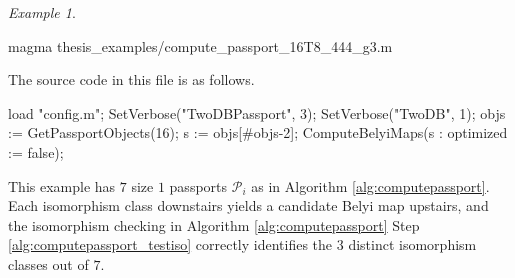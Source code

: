 \documentclass{dcthesis}
\newcommand{\mm}[1]{{\color{blue} \sf MM: [#1]}}
\numberwithin{equation}{section}
\theoremstyle{definition}
\theoremstyle{remark}
\newtheorem{example}[equation]{Example}
\begin{document}
{{{\begin{example}
\begin{code}
magma thesis_examples/compute_passport_16T8_444_g3.m
      \end{code}
      The source code in this file is
      as follows.
      \begin{magma}
load "config.m";
SetVerbose("TwoDBPassport", 3);
SetVerbose("TwoDB", 1);
objs := GetPassportObjects(16);
s := objs[#objs-2];
ComputeBelyiMaps(s : optimized := false);
      \end{magma}
      This example has $7$ size $1$ passports
      $\mathcal{P}_i$ as in
      Algorithm \ref{alg:computepassport}.
      Each isomorphism class downstairs
      yields a candidate Belyi map upstairs,
      and the isomorphism
      checking in
      Algorithm
      \ref{alg:computepassport}
      Step
      \ref{alg:computepassport_testiso}
      correctly identifies the
      $3$ distinct isomorphism classes
      out of $7$.
    \end{example}
  }
}}
\end{document}
